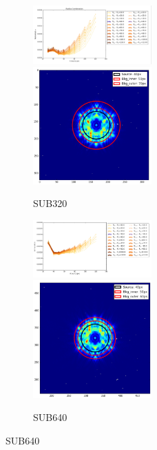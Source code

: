 \documentclass[conference]{IEEEtran}
\begin{document}
        \begin{figure}[H]
            \centering
            \begin{subfigure}{1}
                \includegraphics[width = 0.5\textwidth]{Combo}
                 \includegraphics[width = 0.5\textwidth]{sub320_rings}
                \caption{SUB320}
            \end{subfigure}
        
            \begin{subfigure}{2}
                \includegraphics[width = 0.5\textwidth]{Radius_640}
                \includegraphics[width = 0.5\textwidth]{sub640_rings}
                \caption{SUB640}
            \end{subfigure}
            

\end{figure}
\end{document}
